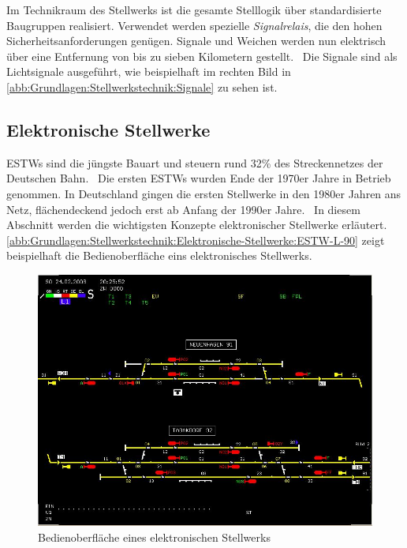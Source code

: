 Im Technikraum des Stellwerks ist die gesamte Stelllogik über standardisierte Baugruppen realisiert. Verwendet werden spezielle \textit{Signalrelais}, die den hohen Sicherheitsanforderungen genügen. Signale und Weichen werden nun elektrisch über eine Entfernung von bis zu sieben Kilometern gestellt.~\cite{bib:DB:Stellwerke} Die Signale sind als Lichtsignale ausgeführt, wie beispielhaft im rechten Bild in \autoref{abb:Grundlagen:Stellwerkstechnik:Signale} zu sehen ist.

\subsection{Elektronische Stellwerke}\label{text:Grundlagen:Stellwerkstechnik:Elektronische-Stellwerke}

\acp{ESTW} sind die jüngste Bauart und steuern rund 32\% des Streckennetzes der Deutschen Bahn.~\cite{bib:DB:Stellwerke} Die ersten \acp{ESTW} wurden Ende der 1970er Jahre in Betrieb genommen. In Deutschland gingen die ersten Stellwerke in den 1980er Jahren ans Netz, flächendeckend jedoch erst ab Anfang der 1990er Jahre.~\cite[][S.192 f.]{bib:Sicherung-des-Schienenverkehrs} In diesem Abschnitt werden die wichtigsten Konzepte elektronischer Stellwerke erläutert. \autoref{abb:Grundlagen:Stellwerkstechnik:Elektronische-Stellwerke:ESTW-L-90} zeigt beispielhaft die Bedienoberfläche eins elektronisches Stellwerks.

\begin{figure}[H]
    \centering
    \includegraphics[width=\textwidth]{Assets/Images/2-Grundlagen/ESTW-L-90.png}
    \caption{Bedienoberfläche eines elektronischen Stellwerks~\cite{bib:bild:wiki:EST-L-90}}\label{abb:Grundlagen:Stellwerkstechnik:Elektronische-Stellwerke:ESTW-L-90}
\end{figure}

